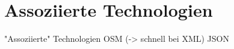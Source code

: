 \section{Assoziierte Technologien}
\label{technologies}
"Assoziierte" Technologien 
OSM (-> schnell bei XML) %
JSON